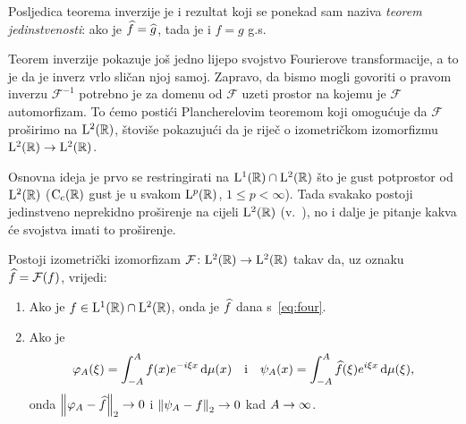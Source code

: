 \documentclass[main.tex]{subfiles}
\begin{document}
Posljedica teorema inverzije je i rezultat koji se ponekad sam
naziva \emph{teorem jedinstvenosti}: ako je
\( \widehat{f} = \widehat{g} \), tada je i \( f=g \) g.s.

Teorem inverzije pokazuje još jedno lijepo svojstvo Fourierove transformacije,
a to je da je inverz vrlo sličan njoj samoj. Zapravo, da bismo mogli
govoriti o pravom inverzu \( \mathcal F^{-1} \) potrebno je za
domenu od \( \mathcal F \) uzeti prostor na kojemu
je \( \mathcal F \) automorfizam.
To ćemo postići Plancherelovim teoremom koji omogućuje da \( \mathcal F \)
proširimo na \( \mathrm{L}^2(\mathbb{R}) \), štoviše pokazujući da je riječ o izometričkom
izomorfizmu \( \mathrm{L}^2(\mathbb{R}) \to \mathrm{L}^2(\mathbb{R}) \).

Osnovna ideja je prvo se restringirati na \( \mathrm{L}^1(\mathbb{R}) \cap \mathrm{L}^2(\mathbb{R}) \)
što je gust potprostor od \( \mathrm{L}^2(\mathbb{R}) \) (\( \mathrm{C}_{\mathrm{c}}(\mathbb{R}) \) gust je u svakom
\( \mathrm{L}^p(\mathbb{R}) \), \( 1 \le p < \infty \)). Tada svakako postoji
jedinstveno neprekidno proširenje na cijeli \( \mathrm{L}^2(\mathbb{R}) \) (v.~\cite[prop.~1.6.8~(iv)]{gogic}),
no i dalje je pitanje kakva će svojstva imati to proširenje.

\begin{teorem}\label{tM:planche}
	Postoji izometrički izomorfizam \( \mathcal F \colon \mathrm{L}^2(\mathbb{R}) \to \mathrm{L}^2(\mathbb{R}) \)
	takav da, uz oznaku \( \widehat{f} = \mathcal F(f) \), vrijedi:
	\begin{enumerate}[label=(\roman*)]
		\item Ako je \( f \in \mathrm{L}^1(\mathbb{R}) \cap \mathrm{L}^2(\mathbb{R}) \), onda je \( \widehat{f} \)
		      dana s~\eqref{eq:four}.
		\item Ako je
		      \begin{equation}
			      \varphi_A(\xi) = \int_{-A}^A f(x)e^{-i\xi x} \,\mathrm d \mu(x)
			      \quad \mathrm i \quad
			      \psi_A(x) = \int_{-A}^A \widehat{f}(\xi) e^{i\xi x} \,\mathrm d \mu(\xi),
		      \end{equation}
		      onda \( \left\lVert\varphi_A - \widehat{f}\right\rVert_2 \rightarrow 0 \) i \( \left\lVert\psi_A - f\right\rVert_2 \rightarrow 0 \)
		      kad \( A \rightarrow \infty \).
	\end{enumerate}
\end{teorem}
\end{document}
